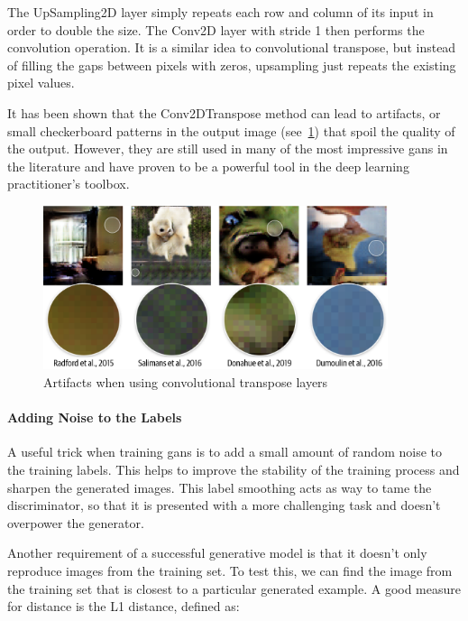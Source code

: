 The UpSampling2D layer simply repeats each row and column of its input in order to double the size.
The Conv2D layer with stride 1 then performs the convolution operation.
It is a similar idea to convolutional transpose, but instead of filling the gaps between pixels with zeros, upsampling just repeats the existing pixel values.


It has been shown that the Conv2DTranspose method can lead to artifacts, or small checkerboard patterns in the output image (see~\cref{fig:upsampling}) that spoil the quality of the output.
However, they are still used in many of the most impressive \glspl{gan}  in the literature and have proven to be a powerful tool in the deep learning practitioner’s toolbox.

\begin{figure}
	\begin{center}
		\includegraphics[width=0.9\textwidth]{figures/upsampling}
	\end{center}
	\caption{Artifacts when using convolutional transpose layers}\label{fig:upsampling}
\end{figure}


\paragraph{Adding Noise to the Labels}

A useful trick when training \glspl{gan}  is to add a small amount of random noise to the training labels.
This helps to improve the stability of the training process and sharpen the generated images.
This label smoothing acts as way to tame the discriminator, so that it is presented with a more challenging task and doesn’t overpower the generator.


Another requirement of a successful generative model is that it doesn’t only reproduce images from the training set.
To test this, we can find the image from the training set that is closest to a particular generated example. A good measure for distance is the L1 distance, defined as:


